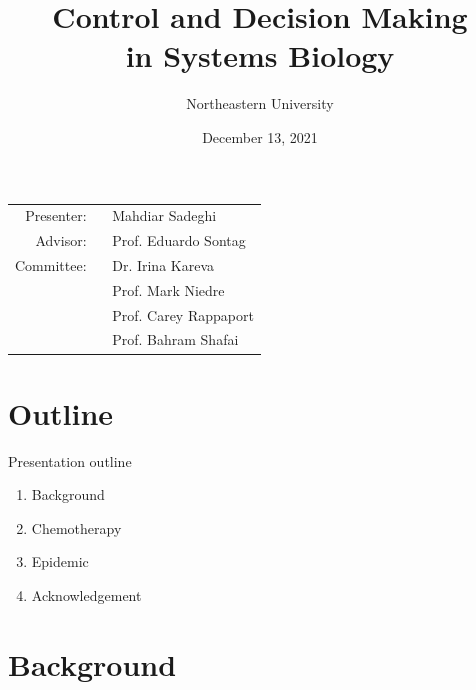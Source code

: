 \documentclass[10pt]{beamer}
\title[Proposal Review]{Control and Decision Making \\ in Systems Biology}
\author{Northeastern University}
\date{December 13, 2021}
\begin{document}
\begin{frame}
	\maketitle
	\small \hspace{2.5cm}
	{\begin{tabular}{r@{}l}
			Presenter: \ & Mahdiar Sadeghi \\
			Advisor:   \  & Prof. Eduardo Sontag \\
			Committee: \  & Dr. Irina Kareva \\
			& Prof. Mark Niedre \\
			& Prof. Carey Rappaport \\
			& Prof. Bahram Shafai
		\end{tabular}
	}
\end{frame}

\section{Outline}

\begin{frame}{Presentation outline}
	\vspace{5pt}
    \begin{enumerate}
    	\item Background     \vspace{0.2cm}
    	\item Chemotherapy \vspace{0.2cm}
    	\item Epidemic        \vspace{0.2cm}
    	\item Acknowledgement
    \end{enumerate}
\end{frame}

\section{Background}
\end{document}
